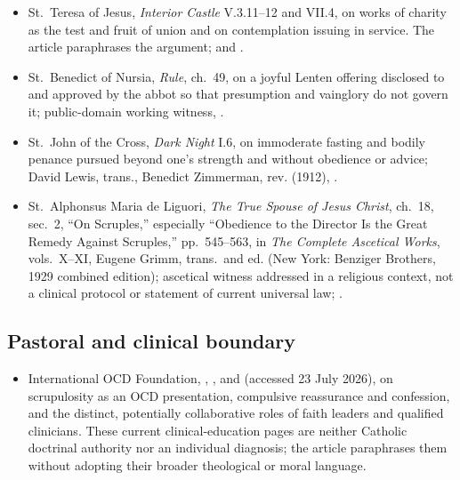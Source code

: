 {\fontsize{8.6}{9.6}\selectfont
\begin{itemize}[itemsep=0pt,parsep=0pt,topsep=0.05em]
\item St.~Teresa of Jesus, \emph{Interior Castle} V.3.11--12 and VII.4, on works of charity as the test and fruit of union and on contemplation issuing in service. The article paraphrases the argument;  and .
\item St.~Benedict of Nursia, \emph{Rule}, ch.~49, on a joyful Lenten offering disclosed to and approved by the abbot so that presumption and vainglory do not govern it; public-domain working witness, .
\item St.~John of the Cross, \emph{Dark Night} I.6, on immoderate fasting and bodily penance pursued beyond one's strength and without obedience or advice; David Lewis, trans., Benedict Zimmerman, rev. (1912), .
\item St.~Alphonsus Maria de Liguori, \emph{The True Spouse of Jesus Christ}, ch.~18, sec.~2, ``On Scruples,'' especially ``Obedience to the Director Is the Great Remedy Against Scruples,'' pp.~545--563, in \emph{The Complete Ascetical Works}, vols.~X--XI, Eugene Grimm, trans.\ and ed. (New York: Benziger Brothers, 1929 combined edition); ascetical witness addressed in a religious context, not a clinical protocol or statement of current universal law; .
\end{itemize}}

\subsection*{Pastoral and clinical boundary}

{\fontsize{8.6}{9.6}\selectfont
\begin{itemize}[itemsep=0pt,parsep=0pt,topsep=0.05em]
\item International OCD Foundation, , , and  (accessed 23 July 2026), on scrupulosity as an OCD presentation, compulsive reassurance and confession, and the distinct, potentially collaborative roles of faith leaders and qualified clinicians. These current clinical-education pages are neither Catholic doctrinal authority nor an individual diagnosis; the article paraphrases them without adopting their broader theological or moral language.
\end{itemize}}

